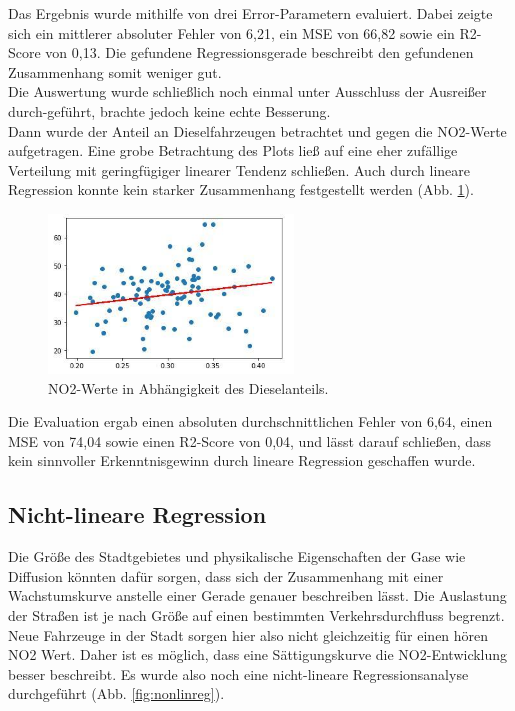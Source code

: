 \documentclass[11pt,a4paper,oneside,german]{article}
\begin{document}
	Das Ergebnis wurde mithilfe von drei Error-Parametern evaluiert. Dabei zeigte sich ein mittlerer absoluter Fehler von 6,21, ein MSE von 66,82 sowie ein R2-Score von 0,13. Die gefundene Regressionsgerade beschreibt den gefundenen Zusammenhang somit weniger gut. \\
	Die Auswertung wurde schließlich noch einmal unter Ausschluss der Ausreißer durch-geführt, brachte jedoch keine echte Besserung. \\
	Dann wurde der Anteil an Dieselfahrzeugen betrachtet und gegen die NO2-Werte aufgetragen. Eine grobe Betrachtung des Plots ließ auf eine eher zufällige Verteilung mit geringfügiger linearer Tendenz schließen. Auch durch lineare Regression konnte kein starker Zusammenhang festgestellt werden (Abb. \ref{fig:linregdieselanteil}).
	
	\begin{figure}[H]
		\centering
		\includegraphics[width=6.5cm]{linregdieselanteil.jpg}
		\caption{NO2-Werte in Abhängigkeit des Dieselanteils.}
		\label{fig:linregdieselanteil}
	\end{figure}
	
	Die Evaluation ergab einen absoluten durchschnittlichen Fehler von 6,64, einen MSE von 74,04 sowie einen R2-Score von 0,04, und lässt darauf schließen, dass kein sinnvoller Erkenntnisgewinn durch lineare Regression geschaffen wurde.
	
	\subsection{Nicht-lineare Regression}
	
	Die Größe des Stadtgebietes und physikalische Eigenschaften der Gase wie Diffusion könnten dafür sorgen, dass sich der Zusammenhang mit einer Wachstumskurve anstelle einer Gerade genauer beschreiben lässt. Die Auslastung der Straßen ist je nach Größe auf einen bestimmten Verkehrsdurchfluss begrenzt. Neue Fahrzeuge in der Stadt sorgen hier also nicht gleichzeitig für einen hören NO2 Wert. Daher ist es möglich, dass eine Sättigungskurve die NO2-Entwicklung besser beschreibt. Es wurde also noch eine nicht-lineare Regressionsanalyse durchgeführt (Abb. \ref{fig:nonlinreg}).
	
\end{document}

